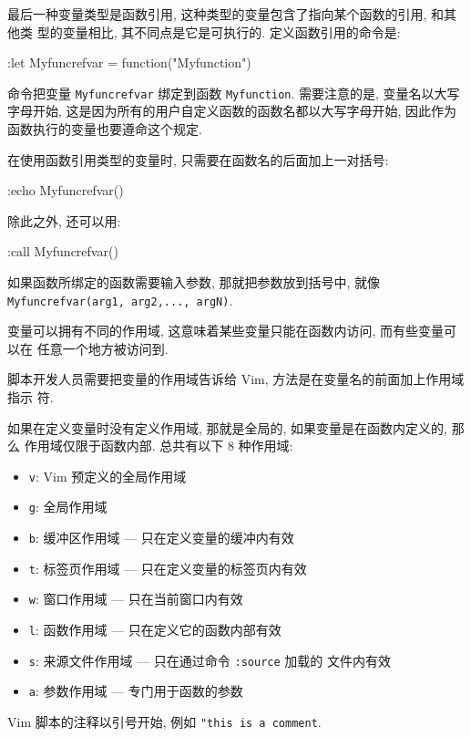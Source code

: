 最后一种变量类型是函数引用, 这种类型的变量包含了指向某个函数的引用, 和其他类
型的变量相比, 其不同点是它是可执行的. 定义函数引用的命令是:
\begin{vimcode}
:let Myfuncrefvar = function("Myfunction")
\end{vimcode}
命令把变量 \texttt{Myfuncrefvar} 绑定到函数 \texttt{Myfunction}. 需要注意的是,
变量名以大写字母开始, 这是因为所有的用户自定义函数的函数名都以大写字母开始,
因此作为函数执行的变量也要遵命这个规定.

在使用函数引用类型的变量时, 只需要在函数名的后面加上一对括号:
\begin{vimcode}
:echo Myfuncrefvar()
\end{vimcode}
除此之外, 还可以用:
\begin{vimcode}
:call Myfuncrefvar()
\end{vimcode}

如果函数所绑定的函数需要输入参数, 那就把参数放到括号中, 就像
\texttt{Myfuncrefvar(arg1, arg2,..., argN)}.

变量可以拥有不同的作用域, 这意味着某些变量只能在函数内访问, 而有些变量可以在
任意一个地方被访问到.

脚本开发人员需要把变量的作用域告诉给 Vim, 方法是在变量名的前面加上作用域指示
符.

如果在定义变量时没有定义作用域, 那就是全局的, 如果变量是在函数内定义的, 那么
作用域仅限于函数内部. 总共有以下 8 种作用域:
\begin{itemize}
    \item \texttt{v}: Vim 预定义的全局作用域
    \item \texttt{g}: 全局作用域
    \item \texttt{b}: 缓冲区作用域 --- 只在定义变量的缓冲内有效
    \item \texttt{t}: 标签页作用域 --- 只在定义变量的标签页内有效
    \item \texttt{w}: 窗口作用域 --- 只在当前窗口内有效
    \item \texttt{l}: 函数作用域 --- 只在定义它的函数内部有效
    \item \texttt{s}: 来源文件作用域 --- 只在通过命令 \texttt{:source} 加载的
        文件内有效
    \item \texttt{a}: 参数作用域 --- 专门用于函数的参数
\end{itemize}

\begin{warning}
    Vim 脚本的注释以引号开始, 例如 \texttt{"this is a comment}.
\end{warning}

